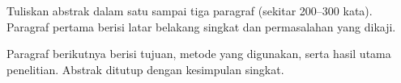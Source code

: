 Tuliskan abstrak dalam satu sampai tiga paragraf (sekitar 200--300 kata). Paragraf pertama berisi latar belakang singkat dan permasalahan yang dikaji.

Paragraf berikutnya berisi tujuan, metode yang digunakan, serta hasil utama penelitian. Abstrak ditutup dengan kesimpulan singkat.

